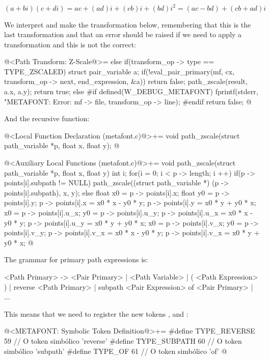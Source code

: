 $$
(a+bi)(c+di) = ac + (ad)i + (cb)i + (bd)i^2 = (ac - bd) + (cb+ad)i
$$

We interpret and make the transformation below, remembering that this
is the last transformation and that an error should be raised if we
need to apply a transformation and this is not the correct:


\iniciocodigo
@<Path Transform: Z-Scale@>=
else if(transform_op -> type == TYPE_ZSCALED){
  struct pair_variable a;
  if(!eval_pair_primary(mf, cx, transform_op -> next, end_expression, &a))
    return false;
  path_zscale(result, a.x, a.y);  
  return true;
}
else{
#if defined(W_DEBUG_METAFONT)
  fprintf(stderr, "METAFONT: Error: %
          mf -> file, transform_op -> line);
#endif
  return false;
}
@
\fimcodigo

And the recursive function:

\iniciocodigo
@<Local Function Declaration (metafont.c)@>+=
void path_zscale(struct path_variable *p, float x, float y);
@
\fimcodigo

\iniciocodigo
@<Auxiliary Local Functions (metafont.c)@>+=
void path_zscale(struct path_variable *p, float x, float y){
  int i;
  for(i = 0; i < p -> length; i ++){
    if(p -> points[i].subpath != NULL)
      path_zscale((struct path_variable *) (p -> points[i].subpath),
                  x, y);
    else{
      float x0 = p -> points[i].x;
      float y0 = p -> points[i].y;
      p -> points[i].x = x0 * x - y0 * y;
      p -> points[i].y = x0 * y + y0 * x;
      x0 = p -> points[i].u_x;
      y0 = p -> points[i].u_y;
      p -> points[i].u_x = x0 * x - y0 * y;
      p -> points[i].u_y = x0 * y + y0 * x;
      x0 = p -> points[i].v_x;
      y0 = p -> points[i].v_y;
      p -> points[i].v_x = x0 * x - y0 * y;
      p -> points[i].v_x = x0 * y + y0 * x;
    }
  }
}
@
\fimcodigo


The grammar for primary path expressions is:

\alinhaverbatim
<Path Primary> -> <Pair Primary> | <Path Variable> |
                  ( <Path Expression> ) |
                  reverse <Path Primary> |
                  subpath <Pair Expression> of <Pair Primary> |
                  ...
\alinhanormal

This means that we need to register the new
tokens ,  and :


\iniciocodigo
@<METAFONT: Symbolic Token Definition@>+=
#define TYPE_REVERSE        59 // O token simbólico 'reverse'
#define TYPE_SUBPATH        60 // O token simbólico 'subpath'
#define TYPE_OF             61 // O token simbólico 'of'
@
\fimcodigo

